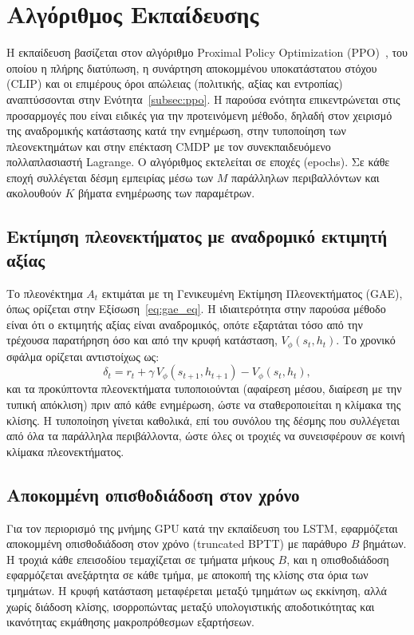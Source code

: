 \section{Αλγόριθμος Εκπαίδευσης}
\label{sec:training}

Η εκπαίδευση βασίζεται στον αλγόριθμο Proximal Policy Optimization
(PPO)~\cite{schulman2017ppo}, του οποίου η πλήρης διατύπωση, η συνάρτηση αποκομμένου
υποκατάστατου στόχου (CLIP) και οι επιμέρους όροι απώλειας (πολιτικής, αξίας
και εντροπίας) αναπτύσσονται στην Ενότητα~\ref{subsec:ppo}. Η παρούσα ενότητα
επικεντρώνεται στις προσαρμογές που είναι ειδικές για την προτεινόμενη μέθοδο,
δηλαδή στον χειρισμό της αναδρομικής κατάστασης κατά την ενημέρωση, στην
τυποποίηση των πλεονεκτημάτων και στην επέκταση CMDP με τον συνεκπαιδευόμενο
πολλαπλασιαστή Lagrange. Ο αλγόριθμος εκτελείται σε εποχές (epochs). Σε κάθε
εποχή συλλέγεται δέσμη εμπειρίας μέσω των $M$ παράλληλων περιβαλλόντων και
ακολουθούν $K$ βήματα ενημέρωσης των παραμέτρων.

\subsection{Εκτίμηση πλεονεκτήματος με αναδρομικό εκτιμητή αξίας}

Το πλεονέκτημα $A_t$ εκτιμάται με τη Γενικευμένη Εκτίμηση Πλεονεκτήματος
(GAE), όπως ορίζεται στην Εξίσωση~\eqref{eq:gae_eq}. Η ιδιαιτερότητα στην
παρούσα μέθοδο είναι ότι ο εκτιμητής αξίας είναι αναδρομικός, οπότε εξαρτάται
τόσο από την τρέχουσα παρατήρηση όσο και από την κρυφή κατάσταση,
$V_\phi(s_t, h_t)$. Το χρονικό σφάλμα ορίζεται αντιστοίχως ως:
\begin{equation}
  \delta_t = r_t + \gamma\, V_\phi(s_{t+1}, h_{t+1}) - V_\phi(s_t, h_t),
  \label{eq:tderror}
\end{equation}
και τα προκύπτοντα πλεονεκτήματα τυποποιούνται (αφαίρεση μέσου, διαίρεση με την
τυπική απόκλιση) πριν από κάθε ενημέρωση, ώστε να σταθεροποιείται η κλίμακα της
κλίσης. Η τυποποίηση γίνεται καθολικά, επί του συνόλου της δέσμης που
συλλέγεται από όλα τα παράλληλα περιβάλλοντα, ώστε όλες οι τροχιές να
συνεισφέρουν σε κοινή κλίμακα πλεονεκτήματος.

\subsection{Αποκομμένη οπισθοδιάδοση στον χρόνο}

Για τον περιορισμό της μνήμης GPU κατά την εκπαίδευση του LSTM, εφαρμόζεται
αποκομμένη οπισθοδιάδοση στον χρόνο (truncated BPTT) με παράθυρο $B$ βημάτων.
Η τροχιά κάθε επεισοδίου τεμαχίζεται σε τμήματα μήκους $B$, και η
οπισθοδιάδοση εφαρμόζεται ανεξάρτητα σε κάθε τμήμα, με αποκοπή της κλίσης στα
όρια των τμημάτων. Η κρυφή κατάσταση μεταφέρεται μεταξύ τμημάτων ως εκκίνηση,
αλλά χωρίς διάδοση κλίσης, ισορροπώντας μεταξύ υπολογιστικής αποδοτικότητας
και ικανότητας εκμάθησης μακροπρόθεσμων εξαρτήσεων.

